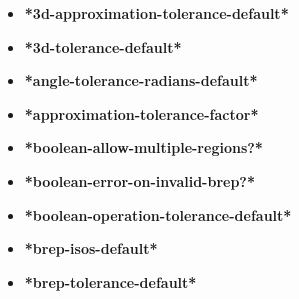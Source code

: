 \documentclass [11pt]{book}
\begin{document}
\begin{itemize}

\item {}
\label{prim:*3d-approximation-tolerance-default*}
\textbf{*3d-approximation-tolerance-default*}





\item {}
\label{prim:*3d-tolerance-default*}
\textbf{*3d-tolerance-default*}





\item {}
\label{prim:*angle-tolerance-radians-default*}
\textbf{*angle-tolerance-radians-default*}





\item {}
\label{prim:*approximation-tolerance-factor*}
\textbf{*approximation-tolerance-factor*}





\item {}
\label{prim:*boolean-allow-multiple-regions?*}
\textbf{*boolean-allow-multiple-regions?*}





\item {}
\label{prim:*boolean-error-on-invalid-brep?*}
\textbf{*boolean-error-on-invalid-brep?*}





\item {}
\label{prim:*boolean-operation-tolerance-default*}
\textbf{*boolean-operation-tolerance-default*}





\item {}
\label{prim:*brep-isos-default*}
\textbf{*brep-isos-default*}





\item {}
\label{prim:*brep-tolerance-default*}
\textbf{*brep-tolerance-default*}






\end{itemize}
\end{document}
